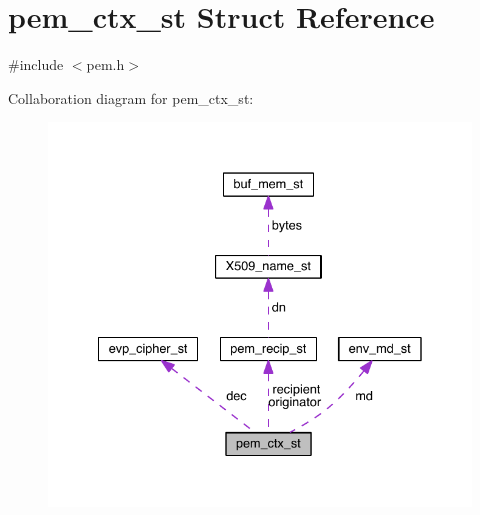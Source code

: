 \hypertarget{structpem__ctx__st}{}\section{pem\+\_\+ctx\+\_\+st Struct Reference}
\label{structpem__ctx__st}


{\ttfamily \#include $<$pem.\+h$>$}



Collaboration diagram for pem\+\_\+ctx\+\_\+st\+:\nopagebreak
\begin{figure}[H]
\begin{center}
\leavevmode
\includegraphics[width=335pt]{structpem__ctx__st__coll__graph}
\end{center}
\end{figure}
